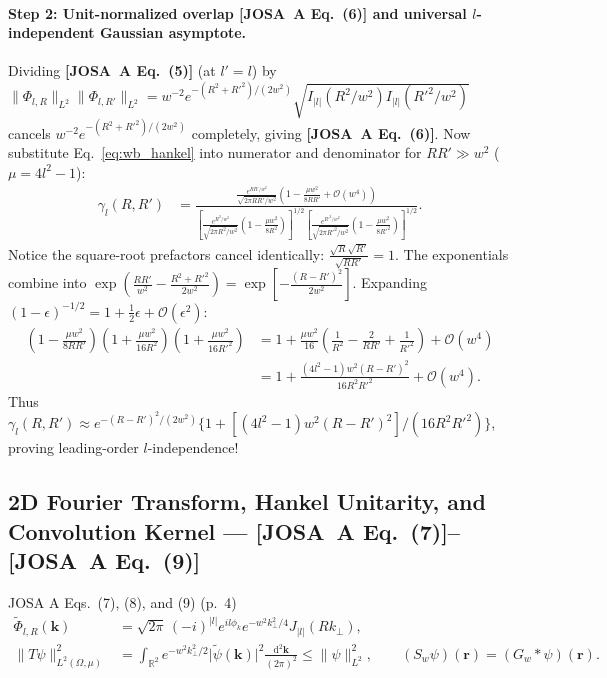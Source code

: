 \documentclass[10pt,letterpaper]{article}
\newcommand{\norm}[1]{\lVert #1 \rVert}
\newcommand{\abs}[1]{\lvert #1 \rvert}
\newcommand{\dd}{\mathrm{d}}
\newcommand{\josa}[1]{\textbf{[JOSA~A Eq.~(#1)]}}
\numberwithin{equation}{section}
\begin{document}
\paragraph*{Step 2: Unit-normalized overlap \josa{6} and universal $l$-independent Gaussian asymptote.}
Dividing \josa{5} (at $l'=l$) by $\norm{\Phi_{l,R}}_{L^2}\norm{\Phi_{l,R'}}_{L^2} = w^{-2} e^{-(R^2+R'^2)/(2w^2)}\sqrt{I_{\abs{l}}(R^2/w^2)I_{\abs{l}}(R'^2/w^2)}$ cancels $w^{-2} e^{-(R^2+R'^2)/(2w^2)}$ completely, giving \josa{6}. Now substitute Eq.~\eqref{eq:wb_hankel} into numerator and denominator for $RR' \gg w^2$ ($\mu = 4l^2 - 1$):
\begin{align}
  \gamma_l(R,R') &= \frac{\frac{e^{RR'/w^2}}{\sqrt{2\pi RR'/w^2}}\left(1 - \frac{\mu w^2}{8RR'} + \mathcal{O}(w^4)\right)}{\left[\frac{e^{R^2/w^2}}{\sqrt{2\pi R^2/w^2}}\left(1 - \frac{\mu w^2}{8R^2}\right)\right]^{1/2}\left[\frac{e^{R'^2/w^2}}{\sqrt{2\pi R'^2/w^2}}\left(1 - \frac{\mu w^2}{8R'^2}\right)\right]^{1/2}}.
\end{align}
Notice the square-root prefactors cancel identically: $\frac{\sqrt{R}\sqrt{R'}}{\sqrt{RR'}} = 1$. The exponentials combine into $\exp(\frac{RR'}{w^2} - \frac{R^2+R'^2}{2w^2}) = \exp[-\frac{(R-R')^2}{2w^2}]$. Expanding $(1 - \epsilon)^{-1/2} = 1 + \frac{1}{2}\epsilon + \mathcal{O}(\epsilon^2)$:
\begin{align}
  \left(1 - \frac{\mu w^2}{8RR'}\right)\left(1 + \frac{\mu w^2}{16 R^2}\right)\left(1 + \frac{\mu w^2}{16 R'^2}\right) &= 1 + \frac{\mu w^2}{16}\left(\frac{1}{R^2} - \frac{2}{RR'} + \frac{1}{R'^2}\right) + \mathcal{O}(w^4) \nonumber \\
  &= 1 + \frac{(4l^2 - 1)w^2(R-R')^2}{16 R^2 R'^2} + \mathcal{O}(w^4).
\end{align}
Thus $\gamma_l(R,R') \approx e^{-(R-R')^2/(2w^2)}\{1 + [(4l^2-1)w^2(R-R')^2]/(16 R^2 R'^2)\}$, proving leading-order $l$-independence!

\subsection{2D Fourier Transform, Hankel Unitarity, and Convolution Kernel --- \josa{7}--\josa{9}}
\label{sec:s3_frame}

\begin{targeteq}{JOSA A Eqs.~(7), (8), and (9) (p.~4)}
\begin{align*}
  \widetilde{\Phi}_{l,R}(\mathbf{k}) &= \sqrt{2\pi}\,(-i)^{\abs{l}} e^{il\phi_k} e^{-w^2 k_\perp^2/4} J_{\abs{l}}(Rk_\perp), \\
  \norm{T\psi}_{L^2(\Omega,\mu)}^2 &= \int_{\mathbb{R}^2} e^{-w^2 k_\perp^2/2}\abs{\widetilde{\psi}(\mathbf{k})}^2\frac{\dd^2\mathbf{k}}{(2\pi)^2} \le \norm{\psi}_{L^2}^2, \qquad (S_w\psi)(\mathbf{r}) = (G_w * \psi)(\mathbf{r}).
\end{align*}
\end{targeteq}
\end{document}
